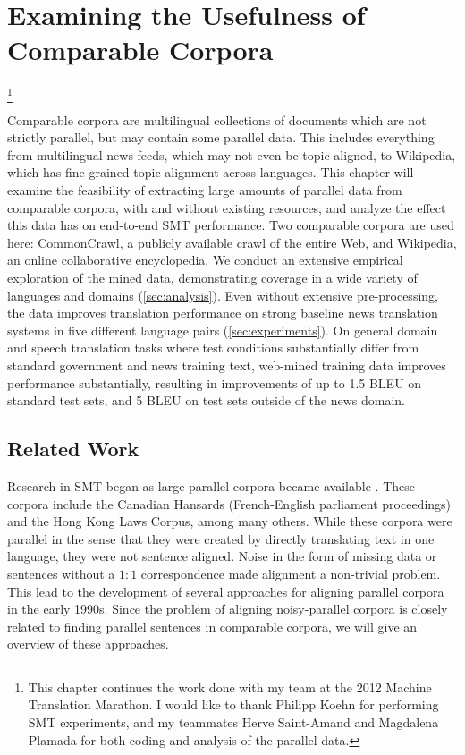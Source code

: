 \chapter{Examining the Usefulness of Comparable Corpora}\footnote{This chapter
continues the work done with my team at the 2012 Machine Translation Marathon.
I would like to thank Philipp Koehn for performing SMT experiments, and my
teammates Herve Saint-Amand and Magdalena Plamada for both coding and analysis
of the parallel data.}
\label{chap:data}

Comparable corpora are multilingual collections of documents which are not
strictly parallel, but may contain some parallel data. This includes everything
from multilingual news feeds, which may not even be topic-aligned, to Wikipedia,
which has fine-grained topic alignment across languages.
This chapter will examine the feasibility of extracting large amounts of
parallel data from comparable corpora, with and without existing resources, and
analyze the effect this data has on end-to-end SMT performance.
Two comparable corpora are used here:
CommonCrawl, a publicly available crawl of the entire Web, and Wikipedia, an
online collaborative encyclopedia.
We conduct an extensive empirical exploration of the mined data, 
demonstrating coverage in a wide variety of languages and domains (\textsection\ref{sec:analysis}). Even 
without extensive pre-processing, the data improves translation performance
on strong baseline news translation systems in five different language pairs
(\textsection\ref{sec:experiments}).
On general domain and speech translation tasks where test conditions substantially
differ from standard government and news training text, web-mined training
data improves performance substantially, resulting in improvements of up
to 1.5 BLEU on standard test sets, and 5 BLEU on test sets outside of the news
domain.

\section{Related Work}
\label{sec:parallel_related}

Research in SMT began as large parallel corpora became available
\citep{Brown88,Brown90,Brown93}. These corpora include the Canadian Hansards
(French-English parliament proceedings) and the Hong Kong Laws Corpus, among many
others. While these corpora were parallel in the sense that they were created by
directly translating text in one language, they were not sentence aligned. Noise
in the form of missing data or sentences without a $1:1$ correspondence made
alignment a non-trivial problem. This lead to the development of several
approaches for aligning parallel corpora in the early 1990s. Since the problem
of aligning noisy-parallel corpora is closely related to finding parallel
sentences in comparable corpora, we will give an
overview of these approaches.

